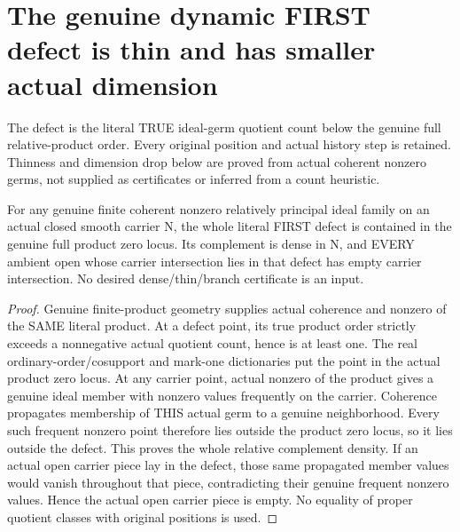 \section{The genuine dynamic FIRST defect is thin and has smaller actual dimension}

The defect is the literal TRUE ideal-germ quotient count below the genuine
full relative-product order. Every original position and actual history step
is retained. Thinness and dimension drop below are proved from actual coherent
nonzero germs, not supplied as certificates or inferred from a count heuristic.

\begin{theorem}
\label{hir:sharp-actual-family-first-defect-thin-dense}
\leanok
For any genuine finite coherent nonzero relatively principal ideal family on
an actual closed smooth carrier N, the whole literal FIRST defect is contained
in the genuine full product zero locus. Its complement is dense in N, and
EVERY ambient open whose carrier intersection lies in that defect has empty
carrier intersection. No desired dense/thin/branch certificate is an input.
\end{theorem}
\begin{proof}
Genuine finite-product geometry supplies actual coherence and nonzero of the
SAME literal product. At a defect point, its true product order strictly
exceeds a nonnegative actual quotient count, hence is at least one. The real
ordinary-order/cosupport and mark-one dictionaries put the point in the actual
product zero locus. At any carrier point, actual nonzero of the product gives
a genuine ideal member with nonzero values frequently on the carrier.
Coherence propagates membership of THIS actual germ to a genuine neighborhood.
Every such frequent nonzero point therefore lies outside the product zero locus,
so it lies outside the defect. This proves the whole relative complement density.
If an actual open carrier piece lay in the defect, those same propagated member
values would vanish throughout that piece, contradicting their genuine frequent
nonzero values. Hence the actual open carrier piece is empty. No equality of
proper quotient classes with original positions is used.
\end{proof}

